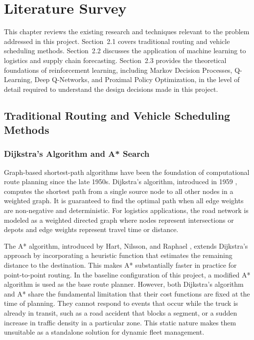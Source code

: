 \chapter{Literature Survey}

This chapter reviews the existing research and techniques relevant to the
problem addressed in this project. Section~2.1 covers traditional routing and
vehicle scheduling methods. Section~2.2 discusses the application of machine
learning to logistics and supply chain forecasting. Section~2.3 provides the
theoretical foundations of reinforcement learning, including Markov Decision
Processes, Q-Learning, Deep Q-Networks, and Proximal Policy Optimization, in
the level of detail required to understand the design decisions made in this
project.

\section{Traditional Routing and Vehicle Scheduling Methods}

\subsection{Dijkstra's Algorithm and A* Search}

Graph-based shortest-path algorithms have been the foundation of computational
route planning since the late 1950s. Dijkstra's algorithm, introduced in 1959
\cite{dijkstra1959}, computes the shortest path from a single source node to all
other nodes in a weighted graph. It is guaranteed to find the optimal path when
all edge weights are non-negative and deterministic. For logistics applications,
the road network is modeled as a weighted directed graph where nodes represent
intersections or depots and edge weights represent travel time or distance.

The A* algorithm, introduced by Hart, Nilsson, and Raphael \cite{hart1968},
extends Dijkstra's approach by incorporating a heuristic function that estimates
the remaining distance to the destination. This makes A* substantially faster in
practice for point-to-point routing. In the baseline configuration of this
project, a modified A* algorithm is used as the base route planner. However, both
Dijkstra's algorithm and A* share the fundamental limitation that their cost
functions are fixed at the time of planning. They cannot respond to events that
occur while the truck is already in transit, such as a road accident that blocks
a segment, or a sudden increase in traffic density in a particular zone. This
static nature makes them unsuitable as a standalone solution for dynamic fleet
management.

